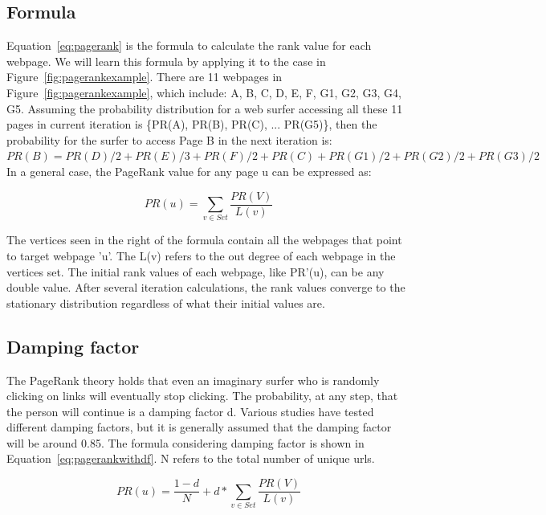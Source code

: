 \subsection*{Formula}

Equation~\ref{eq:pagerank} is the formula to calculate the rank value for each
webpage. We will learn this formula by applying it to the case in
Figure~\ref{fig:pagerankexample}. There are 11 webpages in
Figure~\ref{fig:pagerankexample}, which include: {A, B, C, D, E, F, G1, G2, G3,
G4, G5}. Assuming the probability distribution for a web surfer accessing all
these 11 pages in current iteration is \{PR(A), PR(B), PR(C), ... PR(G5)\},
then the probability for the surfer to access Page B in the next iteration is:
\\

$PR(B) = PR(D)/2 + PR(E)/3 + PR(F)/2 + PR(C) + PR(G1)/2 + PR(G2)/2 + PR(G3)/2 $\\


In a general case, the PageRank value for any page u can be expressed as:

\begin{equation}\label{eq:pagerank}
PR(u) = \sum_{v \in Set} \frac{PR(V)}{L(v)}
\end{equation}

The vertices seen in the right of the formula contain all the webpages that
point to target webpage 'u'. The L(v) refers to the out degree of each webpage
in the vertices set. The initial rank values of each webpage, like PR'(u), can
be any double value. After several iteration calculations, the rank values
converge to the stationary distribution regardless of what their initial values
are.

\subsection*{Damping factor}
The PageRank theory holds that even an imaginary surfer who is randomly
clicking on links will eventually stop clicking. The probability, at any step,
that the person will continue is a damping factor d. Various studies have
tested different damping factors, but it is generally assumed that the damping
factor will be around 0.85. The formula considering damping factor is shown in
Equation~\ref{eq:pagerankwithdf}. N refers to the total number of unique urls. 

\begin{equation}\label{eq:pagerankwithdf}
PR(u) = \frac{1-d}{N} + d * \sum_{v \in Set} \frac{PR(V)}{L(v)}
\end{equation}

